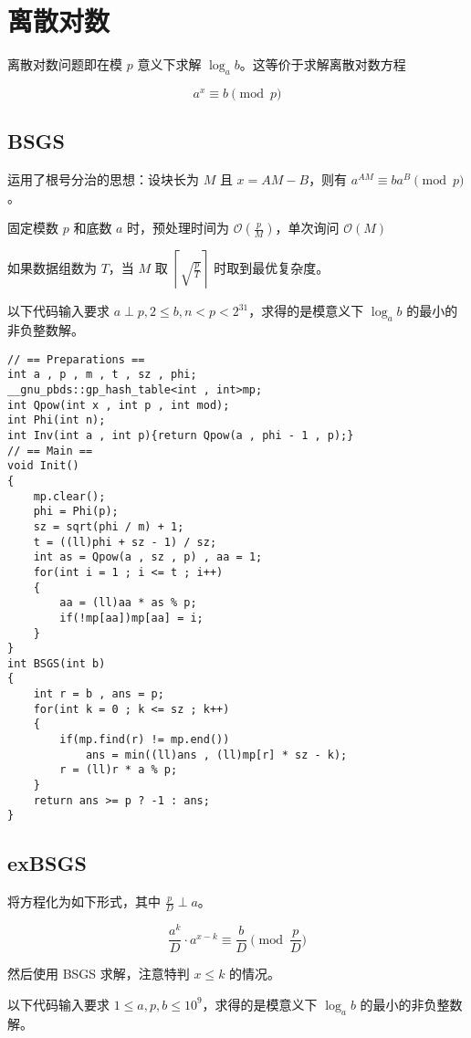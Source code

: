 \section{离散对数}

离散对数问题即在模 $p$ 意义下求解 $\log_{a}{b}$。这等价于求解离散对数方程

$$a^x \equiv b\pmod p$$

\subsection{BSGS}

运用了根号分治的思想：设块长为 $M$ 且 $x=AM-B$，则有 $a^{AM} \equiv ba^{B} \pmod p$。

固定模数 $p$ 和底数 $a$ 时，预处理时间为 $\mathcal{O}(\frac{p}{M})$，单次询问 $\mathcal{O}(M)$

如果数据组数为 $T$，当 $M$ 取 $\left \lceil \sqrt{\frac{p}{T}} \right \rceil$ 时取到最优复杂度。

以下代码输入要求 $a \perp p,2\le b,n < p<2^{31}$，求得的是模意义下 $\log_{a}{b}$ 的最小的非负整数解。

\begin{verbatim}
// == Preparations ==
int a , p , m , t , sz , phi; 
__gnu_pbds::gp_hash_table<int , int>mp;
int Qpow(int x , int p , int mod);
int Phi(int n);
int Inv(int a , int p){return Qpow(a , phi - 1 , p);}
// == Main ==
void Init()
{
    mp.clear();
    phi = Phi(p); 
    sz = sqrt(phi / m) + 1;
    t = ((ll)phi + sz - 1) / sz;
    int as = Qpow(a , sz , p) , aa = 1;
    for(int i = 1 ; i <= t ; i++)
    {
        aa = (ll)aa * as % p;
        if(!mp[aa])mp[aa] = i;
    }
}
int BSGS(int b)
{
    int r = b , ans = p;
    for(int k = 0 ; k <= sz ; k++)
    {
        if(mp.find(r) != mp.end())
            ans = min((ll)ans , (ll)mp[r] * sz - k);
        r = (ll)r * a % p;
    }
    return ans >= p ? -1 : ans;
}
\end{verbatim}

\subsection{exBSGS}

将方程化为如下形式，其中 $\frac{p}{D} \perp a$。

$$\frac{a^k}{D}\cdot a^{x-k}\equiv\frac{b}{D} \pmod{\frac{p}{D}}$$

然后使用 BSGS 求解，注意特判 $x \le k$ 的情况。

以下代码输入要求 $1\le a,p,b\le10^9$，求得的是模意义下 $\log_{a}{b}$ 的最小的非负整数解。

